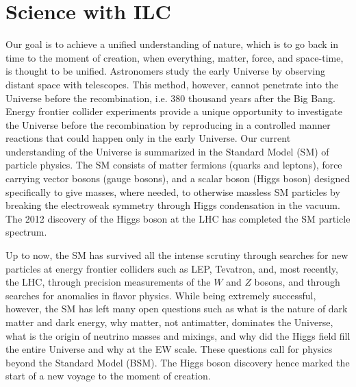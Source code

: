 \chapter{Science with ILC}

Our goal is to achieve a unified understanding of nature, which is to go back in time to the moment of creation, when everything, matter, force, and space-time, is thought to be unified. Astronomers study the early Universe by observing distant space with telescopes. This method, however, cannot penetrate into the Universe before the recombination, i.e. 380 thousand years after the Big Bang. Energy frontier collider experiments provide a unique opportunity to investigate the Universe before the recombination by reproducing in a controlled manner reactions that could happen only in the early Universe. Our current understanding of the Universe is summarized in the Standard Model (SM) of particle physics. The SM consists of matter fermions (quarks and leptons), force carrying vector bosons (gauge bosons), and a scalar boson (Higgs boson) designed specifically to give masses, where needed, to otherwise massless SM particles by breaking the electroweak symmetry through Higgs condensation in the vacuum. The 2012 discovery of the Higgs boson at the LHC has completed the SM particle spectrum. 

Up to now, the SM has survived all the intense scrutiny through searches for new particles at energy frontier colliders such as LEP, Tevatron, and, most recently, the LHC, through precision measurements of the $W$ and $Z$ bosons, and through searches for anomalies in flavor physics. While being extremely successful, however, the SM has left many open questions such as what is the nature of dark matter and dark energy,  why matter, not antimatter, dominates the Universe, what is the origin of neutrino masses and mixings, and why did the Higgs field fill the entire Universe and why at the EW scale. These questions call for physics beyond the Standard Model (BSM). The Higgs boson discovery hence marked the start of a new voyage to the moment of creation.

